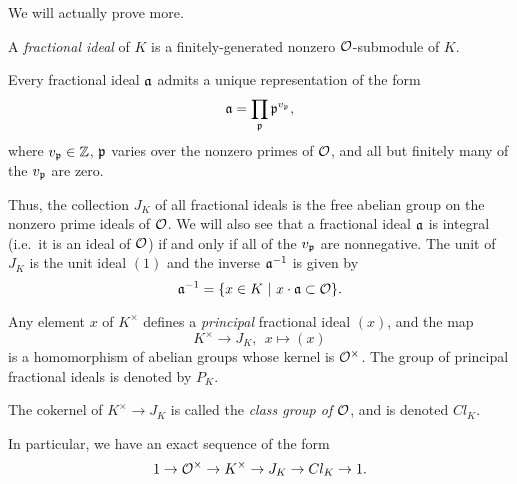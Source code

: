 We will actually prove more.
\begin{definition}
  A \emph{fractional ideal} of $K$ is a finitely-generated nonzero $\mathcal{O}$-submodule of $K$.
\end{definition}

\begin{theorem}\label{theorem:fractional_ideal_factorization}
  Every fractional ideal $\mathfrak{a}$ admits a unique representation of the form
  \[ \mathfrak{a} = \prod_{\mathfrak{p}} \mathfrak{p}^{v_{\mathfrak{p}}}, \]
  where $v_{\mathfrak{p}} \in \mathbb{Z}$, $\mathfrak{p}$ varies over the nonzero primes of $\mathcal{O}$, and all but finitely many of the $v_{\mathfrak{p}}$ are zero.
\end{theorem}

Thus, the collection $J_{K}$ of all fractional ideals is the free abelian group on the nonzero prime ideals of $\mathcal{O}$.
We will also see that a fractional ideal $\mathfrak{a}$ is integral (i.e.~it is an ideal of $\mathcal{O}$) if and only if all of the $v_{\mathfrak{p}}$ are nonnegative.
The unit of $J_{K}$ is the unit ideal $(1)$ and the inverse $\mathfrak{a}^{-1}$ is given by
\[ \mathfrak{a}^{-1} = \{x \in K \ | \ x \cdot \mathfrak{a} \subset \mathcal{O} \}. \]

Any element $x$ of $K^{\times}$ defines a \emph{principal} fractional ideal $(x)$, and the map
\[ K^{\times} \to J_{K}, \ \ x \mapsto (x) \]
is a homomorphism of abelian groups whose kernel is $\mathcal{O}^{\times}$.
The group of principal fractional ideals is denoted by $P_{K}$.
\begin{definition}
  The cokernel of $K^{\times} \to J_{K}$ is called the \emph{class group of $\mathcal{O}$}, and is denoted $Cl_{K}$.
\end{definition}
In particular, we have an exact sequence of the form
\[ 1 \to \mathcal{O}^{\times} \to K^{\times} \to J_{K} \to Cl_{K} \to 1. \]


